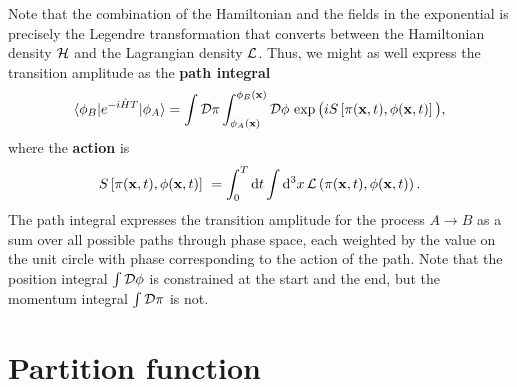 Note that the combination of the Hamiltonian and the fields in the exponential is precisely the Legendre transformation that converts between the Hamiltonian density $\mathcal{H}$ and the Lagrangian density $\mathcal{L}$.
Thus, we might as well express the transition amplitude as the \textbf{path integral}
\begin{equation}
	\braket{\phi_B | e^{- i \hat{H} T} | \phi_A} = \int \mathcal{D} \pi \int_{\phi_A(\mathbf{x})}^{\phi_B(\mathbf{x})} \mathcal{D} \phi \, \exp \big( i S \left[ \pi(\mathbf{x}, t), \phi(\mathbf{x}, t) \right] \big) ,
\label{eq:tft:path_integral_lagrangian}
\end{equation}
where the \textbf{action} is
\begin{equation}
	S \left[ \pi(\vec{x}, t), \phi(\vec{x}, t) \right] = \int_0^T \dif t \int \dif^3 x \, \lagr \left( \pi(\vec{x}, t), \phi(\vec{x}, t) \right) .
\label{eq:tft:action}
\end{equation}
The path integral expresses the transition amplitude for the process $A \rightarrow B$ as a sum over all possible paths through phase space, each weighted by the value on the unit circle with phase corresponding to the action of the path.
Note that the position integral $\int \mathcal{D} \phi$ is constrained at the start and the end, but the momentum integral $\int \mathcal{D} \pi$ is not.

\section{Partition function}

